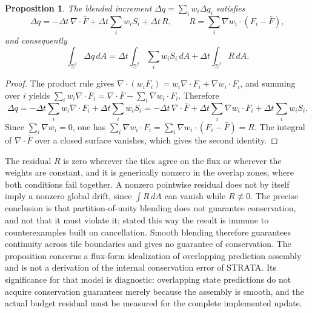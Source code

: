 \documentclass[11pt]{article}
\newtheorem{proposition}{Proposition}
\theoremstyle{definition}
\theoremstyle{remark}
\begin{document}
\begin{proposition}
The blended increment $\Delta q = \sum_i w_i \Delta q_i$ satisfies
\begin{equation}
\Delta q = -\Delta t\,\nabla\!\cdot \bar F + \Delta t \sum_i w_i S_i + \Delta t\, R, \qquad R = \sum_i \nabla w_i \cdot (F_i - \bar F),
\end{equation}
and consequently
\begin{equation}
\int_{\mathbb S^2} \Delta q \, dA = \Delta t \int_{\mathbb S^2} \sum_i w_i S_i \, dA + \Delta t \int_{\mathbb S^2} R \, dA .
\end{equation}
\end{proposition}

\begin{proof}
The product rule gives $\nabla\!\cdot(w_iF_i) = w_i\nabla\!\cdot F_i + \nabla w_i\cdot F_i$, and summing over $i$ yields $\sum_i w_i\nabla\!\cdot F_i = \nabla\!\cdot\bar F - \sum_i \nabla w_i\cdot F_i$. Therefore
\begin{equation*}
\Delta q = -\Delta t\sum_i w_i\nabla\!\cdot F_i + \Delta t\sum_i w_iS_i = -\Delta t\,\nabla\!\cdot\bar F + \Delta t\sum_i\nabla w_i\cdot F_i + \Delta t\sum_i w_iS_i .
\end{equation*}
Since $\sum_i\nabla w_i = 0$, one has $\sum_i\nabla w_i\cdot F_i = \sum_i\nabla w_i\cdot(F_i-\bar F) = R$. The integral of $\nabla\!\cdot\bar F$ over a closed surface vanishes, which gives the second identity.
\end{proof}

The residual $R$ is zero wherever the tiles agree on the flux or wherever the weights are constant, and it is generically nonzero in the overlap zones, where both conditions fail together. A nonzero pointwise residual does not by itself imply a nonzero global drift, since $\int R\,dA$ can vanish while $R\not\equiv 0$. The precise conclusion is that partition-of-unity blending does not guarantee conservation, and not that it must violate it; stated this way the result is immune to counterexamples built on cancellation. Smooth blending therefore guarantees continuity across tile boundaries and gives no guarantee of conservation. The proposition concerns a flux-form idealization of overlapping prediction assembly and is not a derivation of the internal conservation error of STRATA. Its significance for that model is diagnostic: overlapping state predictions do not acquire conservation guarantees merely because the assembly is smooth, and the actual budget residual must be measured for the complete implemented update.
\end{document}
